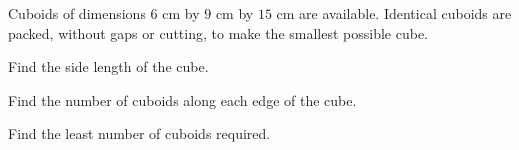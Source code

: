  Cuboids of dimensions $6$ cm by $9$ cm by $15$ cm are available. Identical cuboids are packed, without gaps or cutting, to make the smallest possible cube.
\begin{subparts}
  \item Find the side length of the cube.
  \item Find the number of cuboids along each edge of the cube.
  \item Find the least number of cuboids required.
\end{subparts}
